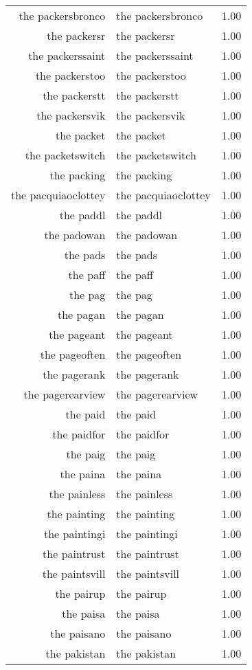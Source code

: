 \begin{table}[ht]
\begin{tabular}{rlr}
  the packersbronco & the packersbronco & 1.00 \\ 
  the packersr & the packersr & 1.00 \\ 
  the packerssaint & the packerssaint & 1.00 \\ 
  the packerstoo & the packerstoo & 1.00 \\ 
  the packerstt & the packerstt & 1.00 \\ 
  the packersvik & the packersvik & 1.00 \\ 
  the packet & the packet & 1.00 \\ 
  the packetswitch & the packetswitch & 1.00 \\ 
  the packing & the packing & 1.00 \\ 
  the pacquiaoclottey & the pacquiaoclottey & 1.00 \\ 
  the paddl & the paddl & 1.00 \\ 
  the padowan & the padowan & 1.00 \\ 
  the pads & the pads & 1.00 \\ 
  the paff & the paff & 1.00 \\ 
  the pag & the pag & 1.00 \\ 
  the pagan & the pagan & 1.00 \\ 
  the pageant & the pageant & 1.00 \\ 
  the pageoften & the pageoften & 1.00 \\ 
  the pagerank & the pagerank & 1.00 \\ 
  the pagerearview & the pagerearview & 1.00 \\ 
  the paid & the paid & 1.00 \\ 
  the paidfor & the paidfor & 1.00 \\ 
  the paig & the paig & 1.00 \\ 
  the paina & the paina & 1.00 \\ 
  the painless & the painless & 1.00 \\ 
  the painting & the painting & 1.00 \\ 
  the paintingi & the paintingi & 1.00 \\ 
  the paintrust & the paintrust & 1.00 \\ 
  the paintsvill & the paintsvill & 1.00 \\ 
  the pairup & the pairup & 1.00 \\ 
  the paisa & the paisa & 1.00 \\ 
  the paisano & the paisano & 1.00 \\ 
  the pakistan & the pakistan & 1.00 \\ 

\end{tabular}
\end{table}
